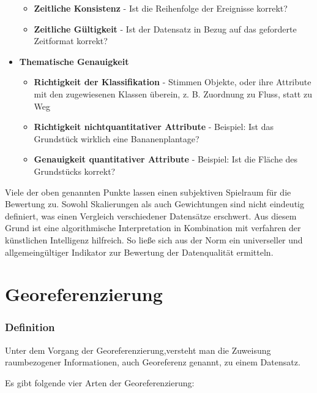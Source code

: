 \documentclass[11pt,ceqn]{book}
\begin{document}
\begin{itemize}
\begin{itemize}
\item \textbf{Zeitliche Konsistenz} - Ist die Reihenfolge der Ereignisse korrekt?
\item
\textbf{Zeitliche Gültigkeit} - Ist der Datensatz in Bezug auf das geforderte Zeitformat korrekt?
\end{itemize}
\item \textbf{Thematische Genauigkeit}
\begin{itemize}
\item
\textbf{Richtigkeit der Klassifikation} - Stimmen Objekte, oder ihre Attribute mit den zugewiesenen Klassen überein, z. B. Zuordnung zu Fluss, statt zu Weg
\item \textbf{Richtigkeit nichtquantitativer Attribute} - Beispiel: Ist das Grundstück wirklich eine Bananenplantage?
\item \textbf{Genauigkeit quantitativer Attribute} - Beispiel: Ist die Fläche des Grundstücks korrekt?
\end{itemize}
\end{itemize}

Viele der oben genannten Punkte lassen einen subjektiven Spielraum für die Bewertung zu. Sowohl Skalierungen als auch Gewichtungen sind nicht eindeutig definiert, was einen Vergleich verschiedener Datensätze erschwert. Aus diesem Grund ist eine algorithmische Interpretation in Kombination mit verfahren der künstlichen Intelligenz hilfreich. So ließe sich aus der Norm ein universeller und allgemeingültiger Indikator zur Bewertung der Datenqualität ermitteln.


\section{Georeferenzierung}
\subsubsection{Definition}
Unter dem Vorgang der Georeferenzierung,versteht man die Zuweisung raumbezogener Informationen, auch Georeferenz genannt, zu einem Datensatz.

Es gibt folgende vier Arten der Georeferenzierung:
\end{document}
